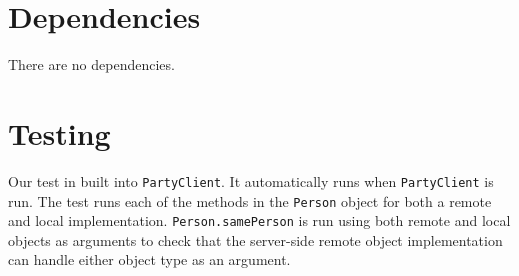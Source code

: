 \documentclass[12pt]{article}
\begin{document}
\section{Dependencies}

There are no dependencies.


\section{Testing}

Our test in built into \texttt{PartyClient}. It automatically runs when \texttt{PartyClient} is run. The test runs each of the methods in the \texttt{Person} object for both a remote and local implementation. \texttt{Person.samePerson} is run using both remote and local objects as arguments to check that the server-side remote object implementation can handle either object type as an argument.
\end{document}
